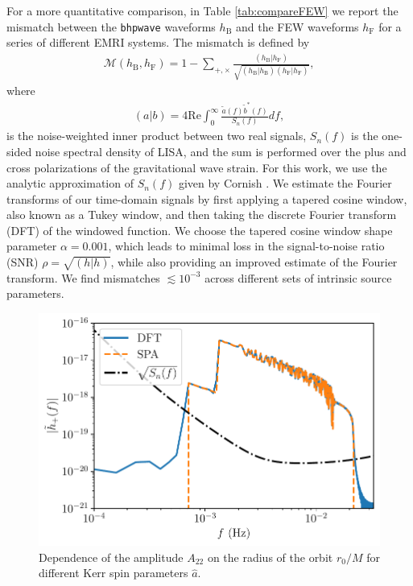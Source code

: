 \documentclass[%
 reprint,
 nofootinbib,
 amsmath,amssymb,
 aps,
 prd,
]{revtex4-2}
\begin{document}
For a more quantitative comparison, in Table \ref{tab:compareFEW} we report the mismatch between the \texttt{bhpwave} waveforms $h_\mathrm{B}$ and the FEW waveforms $h_\mathrm{F}$ for a series of different EMRI systems. The mismatch is defined by
\begin{align}
    \mathcal{M}(h_\mathrm{B}, h_\mathrm{F}) = 1 - \sum_{+,\times} \frac{\left(h_\mathrm{B} | h_\mathrm{F} \right)}{\sqrt{\left(h_\mathrm{B} | h_\mathrm{B} \right)\left(h_\mathrm{F} | h_\mathrm{F} \right)}},
\end{align}
where 
\begin{align}
    \left(a | b \right) = 4 \mathrm{Re} \int_0^\infty \frac{\tilde{a}(f)\tilde{b}^*(f)}{S_n(f)}df,
\end{align}
is the noise-weighted inner product between two real signals, $S_n(f)$ is the one-sided noise spectral density of LISA, and the sum is performed over the plus and cross polarizations of the gravitational wave strain. For this work, we use the analytic approximation of $S_n(f)$ given by Cornish \cite{Corn}. We estimate the Fourier transforms of our time-domain signals by first applying a tapered cosine window, also known as a Tukey window, and then taking the discrete Fourier transform (DFT) of the windowed function. We choose the tapered cosine window shape parameter $\alpha = 0.001$, which leads to minimal loss in the signal-to-noise ratio (SNR) $\rho = \sqrt{(h|h)}$, while also providing an improved estimate of the Fourier transform. We find mismatches $\lesssim 10^{-3}$ across different sets of intrinsic source parameters.

\begin{figure}[!htp]
    \centering
    \includegraphics[width=0.98\linewidth]{figures/dft_comparison.pdf}
    \caption{Dependence of the amplitude $A_{22}$ on the radius of the orbit $r_0/M$ for different Kerr spin parameters $\hat{a}$.}
    \label{fig:amplitudeVariation}
\end{figure}
\end{document}
